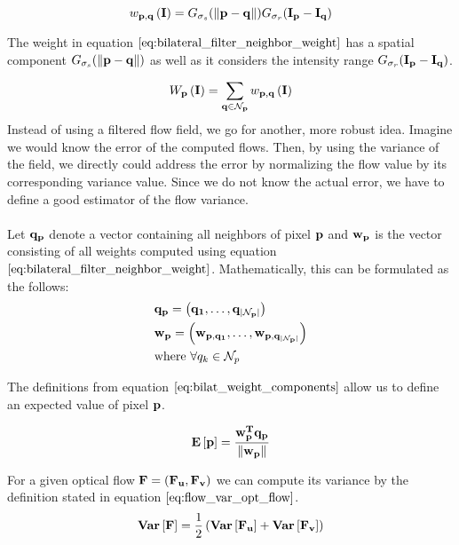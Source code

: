 \begin{equation}
	w_{\bf{p}, \bf{q}} \left( \bf{I} \right) = G_{\sigma_s} (\left\lVert\bf{p} - \bf{q}\right\rVert) G_{\sigma_r} (\bf{I}_{\bf{p}} - \bf{I}_{\bf{q}}) 
\label{eq:bilateral_filter_neighbor_weight}
\end{equation}

The weight in equation $\ref{eq:bilateral_filter_neighbor_weight}$ has a spatial component $G_{\sigma_s} (\left\lVert\bf{p} - \bf{q}\right\rVert)$ as well as it considers the intensity range $G_{\sigma_r} (\bf{I}_{\bf{p}} - \bf{I}_{\bf{q}})$.

\begin{equation}
	W_{\bf{p}} \left( \bf{I} \right) = \sum_{\bf{q} \in \mathcal{N}_p} w_{\bf{p}, \bf{q}} \left( \bf{I} \right)
\label{eq:bilateral_filter_weights}
\end{equation}
Instead of using a filtered flow field, we go for another, more robust idea. Imagine we would know the error of the computed flows. Then, by using the variance of the field, we directly could address the error by normalizing the flow value by its corresponding variance value. Since we do not know the actual error, we have to define a good estimator of the flow variance. \\ \\
Let $\bf{q}_p$ denote a vector containing all neighbors of pixel $\bf{p}$ and $\bf{w}_p$ is the vector consisting of all weights computed using equation $\ref{eq:bilateral_filter_neighbor_weight}$. Mathematically, this can be formulated as the follows:
\begin{equation}
\begin{aligned}
& \bf{q_p} = \left( q_1, \dots, q_{|\mathcal{N}_p|} \right) \\
& \bf{w_p} = \left( w_{p, q_1}, \dots, w_{p, q_{|\mathcal{N}_p|}} \right) \\
& \text{where } \forall q_k \in \mathcal{N}_p
\end{aligned}
\label{eq:bilat_weight_components}
\end{equation}

The definitions from equation $\ref{eq:bilat_weight_components}$ allow us to define an expected value of pixel $\bf{p}$.

\begin{equation}
	\mathbf{E} \left[ \bf{p} \right] = \frac{\bf{w}_{p}^{T} \bf{q}_p}{\left\lVert\bf{w}_{p}\right\rVert}
\end{equation}

For a given optical flow $\bf{F} = (\bf{F_u}, \bf{F_v})$ we can compute its variance by the definition stated in equation $\ref{eq:flow_var_opt_flow}$.
\begin{equation}
	\mathbf{Var} \left[ \bf{F} \right] = \frac{1}{2} \left( \mathbf{Var} \left[ \bf{F_u} \right] + \mathbf{Var} \left[ \bf{F_v} \right] \right)
\label{eq:flow_var_opt_flow}	
\end{equation}

